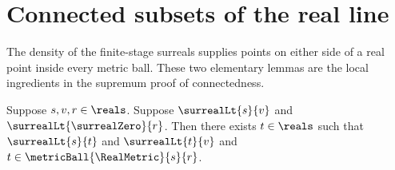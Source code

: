 \section{Connected subsets of the real line}






The density of the finite-stage surreals supplies points on either side of a
real point inside every metric ball.  These two elementary lemmas are the
local ingredients in the supremum proof of connectedness.

\begin{lemma}\label{real_ball_meets_right_open_interval}
    Suppose $s,v,r\in\reals$.
    Suppose $\surrealLt{s}{v}$ and
        $\surrealLt{\surrealZero}{r}$.
    Then there exists $t\in\reals$ such that
        $\surrealLt{s}{t}$ and $\surrealLt{t}{v}$ and
        $t\in\metricBall{\RealMetric}{s}{r}$.
\end{lemma}
